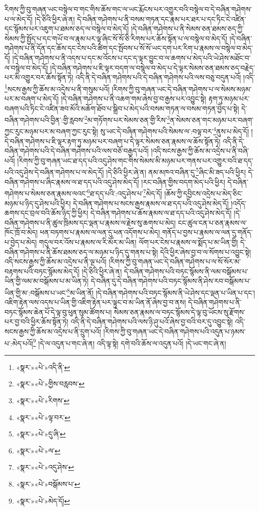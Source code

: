 རིགས་ཀྱི་བུ་གཞན་ཡང་བསྙེལ་བ་གང་གིས་ཆོས་གང་ལ་ཡང་རྨོངས་པར་འགྱུར་བའི་བསྙེལ་བ་དེ་བཞིན་གཤེགས་པ་ལ་མེད་དོ། །དེ་ཅིའི་ཕྱིར་ཞེ་ན། དེ་བཞིན་གཤེགས་པ་ནི་བསམ་གཏན་དང་རྣམ་པར་ཐར་པ་དང་ཏིང་ངེ་འཛིན་དང་སྙོམས་པར་འཇུག་པ་ཐམས་ཅད་ལ་བསྙེལ་བ་མེད་དོ། །དེ་བཞིན་གཤེགས་པ་ནི་སེམས་ཅན་ཐམས་ཅད་ཀྱི་སེམས་ཀྱི་སྤྱོད་པ་དང་གཡོ་བ་ལ་རྣམ་པར་ལྟ་ཞིང་སོ་སོ་ཅི་རིགས་པར་ཆོས་སྟོན་པ་ལ་བསྙེལ་བ་མེད་དོ། །དེ་བཞིན་གཤེགས་པ་ནི་དོན་དང་ཆོས་དང་ངེས་པའི་ཚིག་དང་སྤོབས་པ་སོ་སོ་ཡང་དག་པར་རིག་པ་རྣམས་ལ་བསྙེལ་བ་མེད་དོ། །དེ་བཞིན་གཤེགས་པ་ནི་འདས་པ་དང་མ་འོངས་པ་དང་ད་ལྟར་བྱུང་བ་ལ་ཆགས་པ་མེད་པའི་ཡེ་ཤེས་མཐོང་བ་ལ་བསྙེལ་བ་མེད་དོ། །དེ་བཞིན་གཤེགས་པ་ཇི་ལྟར་བདག་ལ་བསྙེལ་བ་མེད་པ་དེ་ལྟར་སེམས་ཅན་ཐམས་ཅད་བརྗེད་པར་མི་འགྱུར་བར་ཆོས་སྟོན་ཏེ། འདི་ནི་དེ་བཞིན་གཤེགས་པའི་དེ་བཞིན་གཤེགས་པའི་ལས་བཅུ་བདུན་པའོ། །འདི་\footnote{«སྣར་»«པེ་»འདི་ནི་}སངས་རྒྱས་ཀྱི་ཆོས་མ་འདྲེས་པ་ནི་གསུམ་པའོ། །རིགས་ཀྱི་བུ་གཞན་ཡང་དེ་བཞིན་གཤེགས་པ་ལ་སེམས་མཉམ་པར་མ་བཞག་པ་མེད་དོ། །དེ་བཞིན་གཤེགས་པ་ནི་འཆག་གམ་ཞེས་བྱ་བ་རྒྱས་པར་འབྱུང་སྟེ། རྟག་ཏུ་མཉམ་པར་བཞག་པའི་ཏིང་ངེ་འཛིན་ཟབ་མོའི་མཆོག་ཐོབ་པ་སྒྲིབ་པ་མེད་པའི་བསམ་གཏན་ལ་བསམ་གཏན་བྱེད་པ་སྟེ། དེ་བཞིན་གཤེགས་པའི་བྱིན་:གྱི་རླབས་\footnote{«སྣར་»«པེ་»གྱིས་བརླབས་}མ་གཏོགས་པར་སེམས་ཅན་གྱི་རིས་\footnote{«སྣར་»«པེ་»རིགས་}ན་སེམས་ཅན་གང་མཉམ་པར་བཞག་ཀྱང་རུང་མཉམ་པར་མ་བཞག་ཀྱང་རུང་སྟེ། སུ་ཡང་དེ་བཞིན་གཤེགས་པའི་སེམས་ལ་:བལྟ་བར་\footnote{«སྣར་»«པེ་»ལྟ་བར་}ནུས་པ་མེད་དོ། །དེ་བཞིན་གཤེགས་པ་ཇི་ལྟར་རྟག་ཏུ་མཉམ་པར་བཞག་པ་དེ་ལྟར་སེམས་ཅན་རྣམས་ལ་ཆོས་སྟོན་ཏེ། འདི་ནི་དེ་བཞིན་གཤེགས་པའི་དེ་བཞིན་གཤེགས་པའི་ལས་བཅོ་བརྒྱད་པའོ། །འདི་སངས་རྒྱས་ཀྱི་ཆོས་མ་འདྲེས་པ་ནི་བཞི་པའོ། །རིགས་ཀྱི་བུ་གཞན་ཡང་ཐ་དད་པའི་འདུ་ཤེས་གང་གིས་སེམས་མི་མཉམ་པར་གནས་པར་འགྱུར་བའི་ཐ་དད་པའི་འདུ་ཤེས་དེ་བཞིན་གཤེགས་པ་ལ་མེད་དོ། །དེ་ཅིའི་ཕྱིར་ཞེ་ན། ནམ་མཁའ་བཞིན་དུ་\footnote{«སྣར་»«པེ་»དུ་ཞི་}ཞིང་མི་ཟད་པའི་ཕྱིར། དེ་བཞིན་གཤེགས་པ་ཞིང་རྣམས་ལ་ཐ་དད་པའི་འདུ་ཤེས་མེད་དོ། །རང་བཞིན་གྱིས་བདག་མེད་པའི་ཕྱིར། དེ་བཞིན་གཤེགས་པ་སེམས་ཅན་རྣམས་ལའང་\footnote{«སྣར་»«པེ་»ལ་}ཐ་དད་པའི་:འདུ་ཤེས་པ་\footnote{«སྣར་»«པེ་»འདུ་ཤེས་}མེད་དོ། །ཆོས་ཀྱི་དབྱིངས་འདྲེས་པ་མེད་ཅིང་མཉམ་པ་ཉིད་དུ་ཤེས་པའི་ཕྱིར། དེ་བཞིན་གཤེགས་པ་སངས་རྒྱས་རྣམས་ལ་ཐ་དད་པའི་འདུ་ཤེས་མེད་དོ། །འདོད་ཆགས་དང་བྲལ་བའི་ཆོས་ཉིད་ཀྱི་ཕྱིར། དེ་བཞིན་གཤེགས་པ་ཆོས་རྣམས་ལ་ཐ་དད་པའི་འདུ་ཤེས་མེད་དོ། །དེ་བཞིན་གཤེགས་པ་ནི་ཚུལ་ཁྲིམས་དང་ལྡན་པ་རྣམས་ལ་རྗེས་སུ་ཆགས་པ་མེད། ངང་ཚུལ་ངན་པ་ཅན་རྣམས་ལ་ཁོང་ཁྲོ་བ་མེད། ཕན་བཏགས་པ་རྣམས་ལ་ལན་དུ་ཕན་འདོགས་པ་མེད། གནོད་པ་བྱས་པ་རྣམས་ལ་ལན་དུ་གནོད་པ་བྱེད་པ་མེད། གདུལ་བར་འོས་པ་རྣམས་ལ་རི་མོར་མ་ཡིན། ལོག་པར་ངེས་པ་རྣམས་ལ་སྨོད་པ་མ་ཡིན་གྱི། དེ་བཞིན་གཤེགས་པ་ནི་ཆོས་ཐམས་ཅད་ལ་མཉམ་པ་ཉིད་དུ་གནས་པ་སྟེ། དེའི་ཕྱིར་ཞེས་བྱ་བ་ལ་སོགས་པ་འབྱུང་སྟེ། འདི་སངས་རྒྱས་ཀྱི་ཆོས་མ་འདྲེས་པ་ནི་ལྔ་པའོ། །རིགས་ཀྱི་བུ་གཞན་ཡང་དེ་བཞིན་གཤེགས་པ་ལ་སོ་སོར་མ་བརྟགས་པའི་བཏང་སྙོམས་མེད་དོ། །དེ་ཅིའི་ཕྱིར་ཞེ་ན། དེ་བཞིན་གཤེགས་པའི་བཏང་སྙོམས་ནི་ལམ་བསྒོམས་པ་ཡིན་གྱི་ལམ་མ་བསྒོམས་པ་མ་ཡིན་ཏེ། དེ་བཞིན་དུ་དེ་བཞིན་གཤེགས་པའི་བཏང་སྙོམས་ནི་ཤེས་རབ་བསྒོམས་པ་ཡིན་གྱི་མ་:བསྒོམས་པ་ཡང་\footnote{«སྣར་»«པེ་»བསྒོམས་པ་}མ་ཡིན་ནོ། །དེ་བཞིན་གཤེགས་པའི་བཏང་སྙོམས་ནི་ཡེ་ཤེས་དང་ལྡན་པ་ཡིན་པ་དང་། འཇིག་རྟེན་ལས་འདས་པ་ཡིན་གྱི་འཇིག་རྟེན་པར་ལྟུང་བ་མ་ཡིན་ནོ་ཞེས་བྱ་བ་ནས། དེ་བཞིན་གཤེགས་པ་ནི་བཏང་སྙོམས་ཆེན་པོ་དེ་ལྟ་བུ་ཕུན་སུམ་ཚོགས་པ། སེམས་ཅན་རྣམས་ལ་བཏང་སྙོམས་དེ་ལྟ་བུ་ཡོངས་སུ་རྫོགས་པར་བྱ་བའི་ཕྱིར་ཆོས་སྟོན་ཏེ། འདི་ནི་དེ་བཞིན་གཤེགས་པའི་ལས་ཉི་ཤུ་པའོ་ཞེས་བྱ་བའི་བར་དུ་འབྱུང་སྟེ། འདི་སངས་རྒྱས་ཀྱི་ཆོས་མ་འདྲེས་པ་ནི་དྲུག་པའོ། །རིགས་ཀྱི་བུ་གཞན་ཡང་དེ་བཞིན་གཤེགས་པའི་འདུན་པ་ཉམས་པ་:མེད་པའོ།\footnote{«སྣར་»«པེ་»མེད་དོ།} །དེ་ལ་འདུན་པ་གང་ཞེ་ན། འདི་ལྟ་སྟེ། དགེ་བའི་ཆོས་ལ་འདུན་པའོ། །དེ་ཡང་གང་ཞེ་ན། 